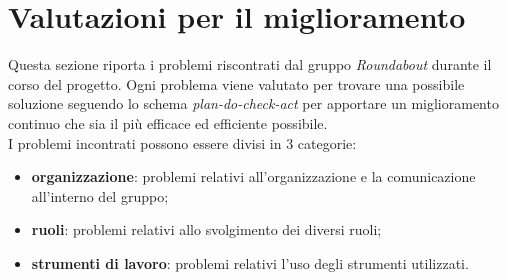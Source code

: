 \section{Valutazioni per il miglioramento}
	Questa sezione riporta i problemi riscontrati dal gruppo \textit{Roundabout} durante il corso del progetto. Ogni problema viene valutato per trovare una possibile soluzione seguendo lo schema \textit{plan-do-check-act} per apportare un miglioramento continuo che sia il più efficace ed efficiente possibile. \\
	I problemi incontrati possono essere divisi in 3 categorie:
	\begin{itemize}
		\item \textbf{organizzazione}: problemi relativi all’organizzazione e la comunicazione all’interno del gruppo;
		\item \textbf{ruoli}: problemi relativi allo svolgimento dei diversi ruoli;
		\item \textbf{strumenti di lavoro}: problemi relativi l’uso degli strumenti utilizzati.
	\end{itemize}

